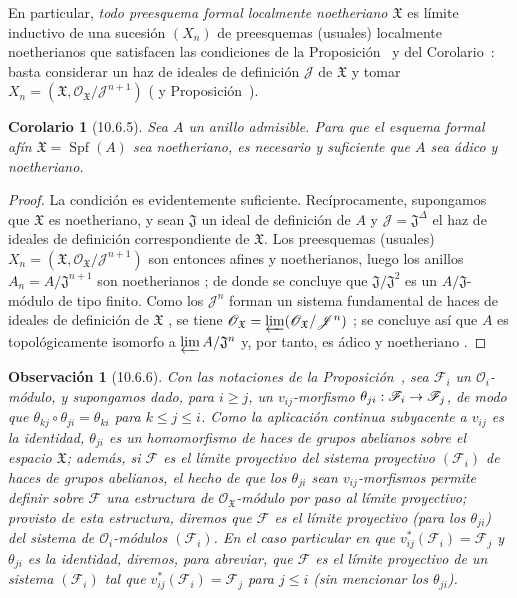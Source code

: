 \documentclass[oneside]{amsart}
\theoremstyle{ega-env-style}
\theoremstyle{ega-thm-env-style}
\newtheorem*{corollary}{Corolario}
\theoremstyle{ega-defn-env-style}
\newtheorem*{remark}{Observación}
\def\leq{\leqslant}                 %
\def\geq{\geqslant}                 %
\renewcommand{\to}{\mathchoice{\longrightarrow}{\rightarrow}{\rightarrow}{\rightarrow}}
\let\EGAOriginalLabel\label
\renewcommand{\label}[1]{\phantomsection\EGAOriginalLabel{#1}}
\begin{document}
En particular, \emph{todo preesquema formal localmente noetheriano $\mathfrak{X}$} es límite inductivo de una sucesión $(X_n)$ de preesquemas (usuales) localmente noetherianos que satisfacen las condiciones de la Proposición~ y del Corolario~: basta considerar un haz de ideales de definición $\mathscr{J}$ de $\mathfrak{X}$  y tomar $X_n=(\mathfrak{X},
\mathscr{O}_{\mathfrak{X}}/\mathscr{J}^{n+1})$ ( y Proposición~).

\begin{corollary}[10.6.5]
\label{I.10.6.5}
Sea $A$ un anillo admisible.
Para que el esquema formal afín $\mathfrak{X}=\operatorname{Spf}(A)$ sea noetheriano, es necesario y suficiente que $A$ sea ádico y noetheriano.
\end{corollary}

\begin{proof}
La condición es evidentemente suficiente.
Recíprocamente, supongamos que $\mathfrak{X}$ es noetheriano, y sean $\mathfrak{J}$ un ideal de definición de $A$ y $\mathscr{J}=\mathfrak{J}^\Delta$ el haz de ideales de definición correspondiente de $\mathfrak{X}$.
Los preesquemas (usuales) $X_n=(\mathfrak{X},
\mathscr{O}_{\mathfrak{X}}/\mathscr{J}^{n+1})$ son entonces afines y noetherianos, luego los anillos $A_n=A/\mathfrak{J}^{n+1}$ son noetherianos ; de donde se concluye que $\mathfrak{J}/\mathfrak{J}^2$ es un $A/\mathfrak{J}$-módulo de tipo finito.
Como los $\mathscr{J}^n$ forman un sistema fundamental de haces de ideales de definición de $\mathfrak{X}$ , se tiene $\mathscr{O}_{\mathfrak{X}}
=\varprojlim(\mathscr{O}_{\mathfrak{X}}/\mathscr{J}^n)$ ; se concluye así  que $A$ es topológicamente isomorfo a $\varprojlim A/\mathfrak{J}^n$ y, por tanto, es ádico y noetheriano .
\end{proof}

\begin{remark}[10.6.6]
\label{I.10.6.6}
Con las notaciones de la Proposición~, sea $\mathscr{F}_i$ un $\mathscr{O}_i$-módulo, y supongamos dado, para $i\geq j$, un $v_{ij}$-morfismo $\theta_{ji}:\mathscr{F}_i\to\mathscr{F}_j$, de modo que $\theta_{kj}\circ\theta_{ji}=\theta_{ki}$ para $k\leq j\leq i$.
Como la aplicación continua subyacente a $v_{ij}$ es la identidad, $\theta_{ji}$ es un homomorfismo de haces de grupos abelianos sobre el espacio $\mathfrak{X}$; además, si $\mathscr{F}$ es el límite proyectivo del sistema proyectivo $(\mathscr{F}_i)$ de haces de grupos abelianos, el hecho de que los $\theta_{ji}$ sean $v_{ij}$-morfismos permite definir sobre $\mathscr{F}$ una estructura de $\mathscr{O}_{\mathfrak{X}}$-módulo por paso al límite proyectivo; provisto de esta estructura, diremos que $\mathscr{F}$ es el \emph{límite proyectivo} (para los $\theta_{ji}$) del sistema de $\mathscr{O}_i$-módulos $(\mathscr{F}_i)$.
En el caso particular en que $v_{ij}^*(\mathscr{F}_i)=\mathscr{F}_j$ y $\theta_{ji}$ es la \emph{identidad}, diremos, para abreviar, que $\mathscr{F}$ es el límite proyectivo de un sistema $(\mathscr{F}_i)$ tal que $v_{ij}^*(\mathscr{F}_i)=\mathscr{F}_j$ para $j\leq i$ (sin mencionar los $\theta_{ji}$).
\end{remark}
\end{document}
